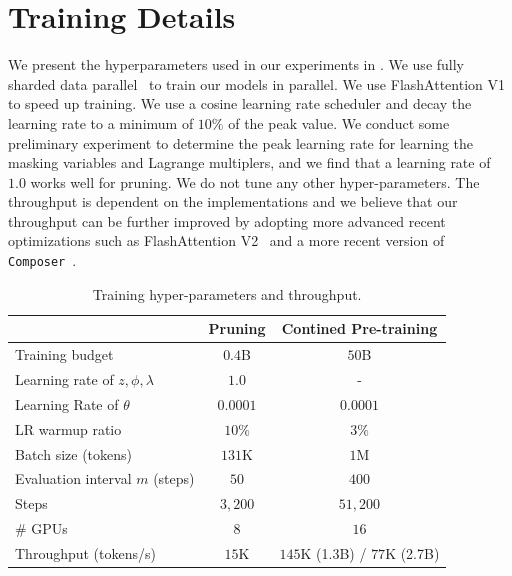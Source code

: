 \section{Training Details}
\label{app:throughput}

We present the hyperparameters used in our experiments in . We use fully sharded data parallel~\citep{zhao2023pytorch} to train our models in parallel. We use FlashAttention V1~\citep{dao2022flashattention} to speed up training. We use a cosine learning rate scheduler and decay the learning rate to a minimum of $10\%$ of the peak value. We conduct some preliminary experiment to determine the peak learning rate for learning the masking variables and Lagrange multiplers, and we find that a learning rate of $1.0$ works well for pruning. We do not tune any other hyper-parameters. The throughput is dependent on the implementations and we believe that our throughput can be further improved by adopting more advanced recent optimizations such as FlashAttention V2~\citep{dao2022flashattention} and a more recent version of \texttt{Composer}~\citep{mosaicml2022composer}.

\begin{table}[h]
    \label{tab:training_details}
    \centering
    \caption{Training hyper-parameters and throughput.}
    \begin{tabular}{lcc} \toprule
                                                                    & Pruning  & Contined Pre-training \\ \midrule
    Training budget                                                 & $0.4$B     & $50$B                   \\
    Learning rate of $z, \phi, \lambda$ & $1.0$        & -                     \\
    Learning Rate of $\theta$                          & $0.0001$ & $0.0001$              \\
    LR warmup ratio                                                 & $10\%$     & $3\%$                   \\
    Batch size        (tokens)                                              & $131$K     & $1$M                    \\
    Evaluation interval $m$       (steps)                                 & $50$       & $400$               \\ 
    Steps & $3,200$ & $51,200$ \\
    \# GPUs & $8$ & $16$ \\
    Throughput (tokens/s) & $15$K & $145$K (1.3B) / $77$K (2.7B) 
    \\
    \bottomrule 
    \end{tabular}
\end{table}




